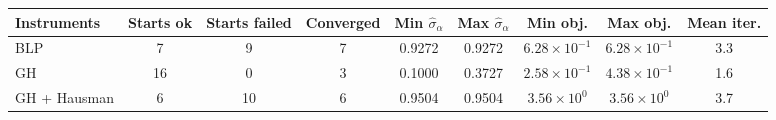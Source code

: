 \begin{tabular}{lcccccccc}
\toprule
Instruments & Starts ok & Starts failed & Converged & Min $\hat\sigma_\alpha$ & Max $\hat\sigma_\alpha$ & Min obj. & Max obj. & Mean iter. \\
\midrule
BLP & 7 & 9 & 7 & 0.9272 & 0.9272 & $6.28\times10^{-1}$ & $6.28\times10^{-1}$ & 3.3 \\
GH & 16 & 0 & 3 & 0.1000 & 0.3727 & $2.58\times10^{-1}$ & $4.38\times10^{-1}$ & 1.6 \\
GH + Hausman & 6 & 10 & 6 & 0.9504 & 0.9504 & $3.56\times10^{0}$ & $3.56\times10^{0}$ & 3.7 \\
\bottomrule
\end{tabular}

